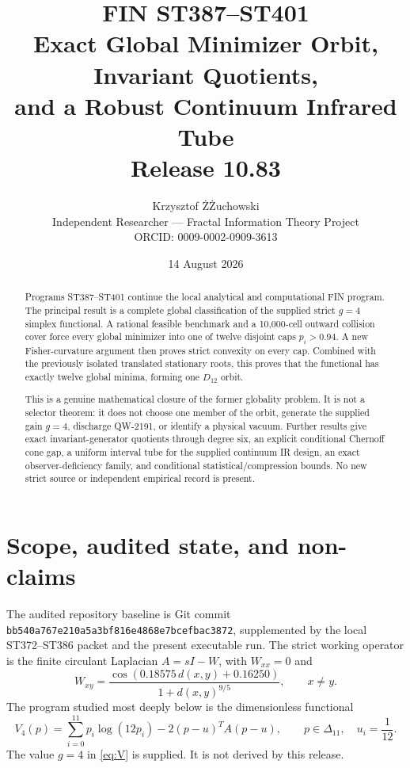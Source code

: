 \documentclass[11pt,a4paper]{article}
\title{\textbf{FIN ST387--ST401}\\[3pt]
Exact Global Minimizer Orbit, Invariant Quotients,\\
and a Robust Continuum Infrared Tube\\[6pt]
\large Release 10.83}
\author{Krzysztof \ifdefined\pdftexversion \.{Z}\else Ż\fi uchowski\\
\small Independent Researcher --- Fractal Information Theory Project\\
\small ORCID: 0009-0002-0909-3613}
\date{14 August 2026}
\begin{document}
\maketitle

\begin{abstract}
Programs ST387--ST401 continue the local analytical and computational FIN program.
The principal result is a complete global classification of the supplied strict
$g=4$ simplex functional.  A rational feasible benchmark and a 10,000-cell outward
collision cover force every global minimizer into one of twelve disjoint caps
$p_i>0.94$.  A new Fisher-curvature argument then proves strict convexity on every
cap.  Combined with the previously isolated translated stationary roots, this proves
that the functional has exactly twelve global minima, forming one $D_{12}$ orbit.

This is a genuine mathematical closure of the former globality problem.  It is not a
selector theorem: it does not choose one member of the orbit, generate the supplied
gain $g=4$, discharge QW-2191, or identify a physical vacuum.  Further results give
exact invariant-generator quotients through degree six, an explicit conditional
Chernoff cone gap, a uniform interval tube for the supplied continuum IR design,
an exact observer-deficiency family, and conditional statistical/compression bounds.
No new strict source or independent empirical record is present.
\end{abstract}

\tableofcontents
\newpage

\section{Scope, audited state, and non-claims}

The audited repository baseline is Git commit
\texttt{bb540a767e210a5a3bf816e4868e7bcefbac3872}, supplemented by the local
ST372--ST386 packet and the present executable run.  The strict working operator is
the finite circulant Laplacian $A=sI-W$, with $W_{xx}=0$ and
\[
 W_{xy}=\frac{\cos(0.18575\,d(x,y)+0.16250)}{1+d(x,y)^{9/5}},\qquad x\ne y.
\]
The program studied most deeply below is the dimensionless functional
\begin{equation}\label{eq:V}
 V_4(p)=\sum_{i=0}^{11}p_i\log(12p_i)-2(p-u)^TA(p-u),
 \qquad p\in\Delta_{11},\quad u_i=\frac1{12}.
\end{equation}
The value $g=4$ in \eqref{eq:V} is supplied.  It is not derived by this release.
\end{document}
